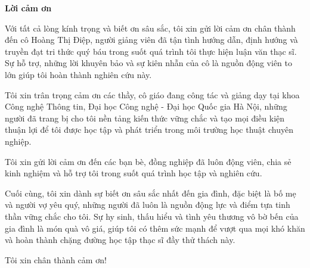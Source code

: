 \begin{center}
\textbf{\large{Lời cảm ơn}	}
\end{center}
Với tất cả lòng kính trọng và biết ơn sâu sắc, tôi xin gửi lời cảm ơn chân thành đến cô Hoàng Thị Điệp, người giảng viên đã tận tình hướng dẫn, định hướng và truyền đạt tri thức quý báu trong suốt quá trình tôi thực hiện luận văn thạc sĩ. Sự hỗ trợ, những lời khuyên bảo và sự kiên nhẫn của cô là nguồn động viên to lớn giúp tôi hoàn thành nghiên cứu này.

Tôi xin trân trọng cảm ơn các thầy, cô giáo đang công tác và giảng dạy tại khoa Công nghệ Thông tin, Đại học Công nghệ - Đại học Quốc gia Hà Nội, những người đã trang bị cho tôi nền tảng kiến thức vững chắc và tạo mọi điều kiện thuận lợi để tôi được học tập và phát triển trong môi trường học thuật chuyên nghiệp.

Tôi xin gửi lời cảm ơn đến các bạn bè, đồng nghiệp đã luôn động viên, chia sẻ kinh nghiệm và hỗ trợ tôi trong suốt quá trình học tập và nghiên cứu.

Cuối cùng, tôi xin dành sự biết ơn sâu sắc nhất đến gia đình, đặc biệt là bố mẹ và người vợ yêu quý, những người đã luôn là nguồn động lực và điểm tựa tinh thần vững chắc cho tôi. Sự hy sinh, thấu hiểu và tình yêu thương vô bờ bến của gia đình là món quà vô giá, giúp tôi có thêm sức mạnh để vượt qua mọi khó khăn và hoàn thành chặng đường học tập thạc sĩ đầy thử thách này.

Tôi xin chân thành cảm ơn!